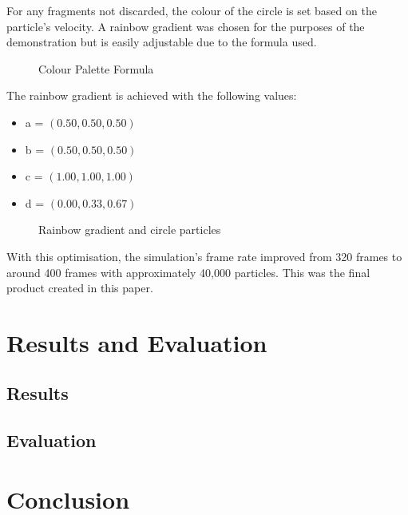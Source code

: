 \documentclass[12pt]{article}
\newcommand{\wideimage}[2][]{%
  \makebox[\textwidth][c]{\texttt{[image: \#2]}}%
}
\begin{document}
    For any fragments not discarded, the colour of the circle is set based on the particle's velocity. A rainbow gradient was chosen for the purposes of the demonstration but is easily adjustable due to the formula used\cite{colours}.

    \begin{figure}[H]
        \begin{center}
            \wideimage[]{paletteHelper.png}
            \caption{Colour Palette Formula \cite{colours}}
        \end{center}
    \end{figure}

    The rainbow gradient is achieved with the following values:
    \begin{itemize}
        \item a = $(0.50, 0.50, 0.50)$
        \item b = $(0.50, 0.50, 0.50)$
        \item c = $(1.00, 1.00, 1.00)$
        \item d = $(0.00, 0.33, 0.67)$
    \end{itemize}

    \begin{figure}[H]
        \begin{center}
            \wideimage[width=0.5\textwidth]{finalAppearance.png}
            \caption{Rainbow gradient and circle particles}
        \end{center}
    \end{figure}

    With this optimisation, the simulation's frame rate improved from 320 frames to around 400 frames with approximately 40,000 particles. This was the final product created in this paper.

    \newpage

    \section{Results and Evaluation}
    \label{sec:resultsandevaluation}
    \subsection{Results}
    \subsection{Evaluation}

    \newpage

    \section{Conclusion}
    \label{sec:conclusion}
\end{document}
